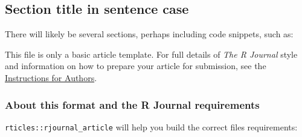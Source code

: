 \hypertarget{section-title-in-sentence-case}{%
\subsection{Section title in sentence
case}\label{section-title-in-sentence-case}}

%
%
%



There will likely be several sections, perhaps including code snippets,
such as:

%
%

This file is only a basic article template. For full details of
\emph{The R Journal} style and information on how to prepare your
article for submission, see the
\href{https://journal.r-project.org/share/author-guide.pdf}{Instructions
for Authors}.

\hypertarget{about-this-format-and-the-r-journal-requirements}{%
\subsubsection{About this format and the R Journal
requirements}\label{about-this-format-and-the-r-journal-requirements}}

\texttt{rticles::rjournal\_article} will help you build the correct
files requirements:

